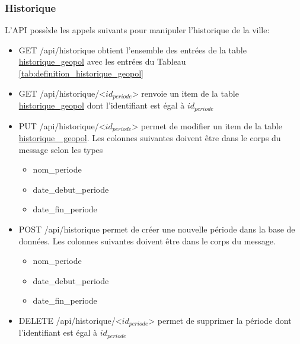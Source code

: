 \subsubsection{Historique}
L'\ac{API}  possède les appels suivants pour manipuler l'historique de la ville:
\begin{itemize}
    \item GET /api/historique obtient l'ensemble des entrées de la table \ul{historique\_geopol} avec les entrées du Tableau \ref{tab:definition_historique_geopol}
    \item GET /api/historique/<$id_{periode}$> renvoie un item de la table \ul{historique\_geopol} dont l'identifiant est égal à $id_{periode}$
    \item PUT /api/historique/<$id_{periode}$> permet de modifier un item de la table \ul{historique\_ geopol}. Les colonnes suivantes doivent être dans le corps du message selon les types 
    \begin{itemize}
        \item nom\_periode 
        \item date\_debut\_periode
        \item date\_fin\_periode
    \end{itemize}
    \item POST /api/historique permet de créer une nouvelle période dans la base de données. Les colonnes suivantes doivent être dans le corps du message.
    \begin{itemize}
        \item nom\_periode 
        \item date\_debut\_periode
        \item date\_fin\_periode
    \end{itemize}
    \item DELETE /api/historique/<$id_{periode}$> permet de supprimer la période dont l'identifiant est égal à $id_{periode}$
\end{itemize}


